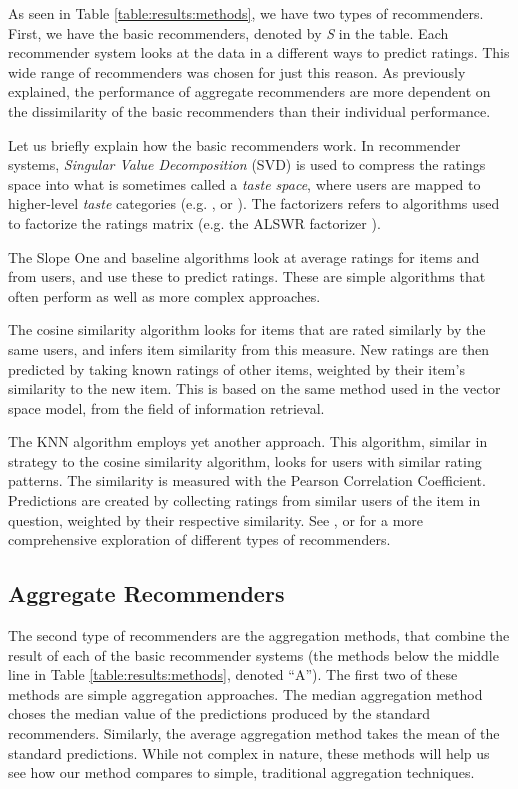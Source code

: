 As seen in Table \ref{table:results:methods}, we have two types of recommenders.
First, we have the basic recommenders, denoted by \emph{S} in the table.
Each recommender system looks at the data in a different ways to predict ratings.
This wide range of recommenders was chosen for just this reason.
As previously explained, the performance of aggregate recommenders
are more dependent on the dissimilarity of the basic recommenders
than their individual performance.

Let us briefly explain how the basic recommenders work.
In recommender systems, \emph{Singular Value Decomposition} (SVD) is used to compress 
the ratings space into what is sometimes called a \emph{taste space},
where users are mapped to higher-level \emph{taste} categories
(e.g. \cite[p.5]{Ahn2004}, \cite[p.4]{Brand2003} or \cite[p.2]{Liu2006}).
The factorizers refers to algorithms used to factorize the ratings matrix
(e.g. the ALSWR factorizer \cite{Zhou2008}).

The Slope One and baseline algorithms look at average
ratings for items and from users, and use these to predict ratings.
These are simple algorithms that often perform as well
as more complex approaches.

The cosine similarity algorithm looks for items that are rated
similarly by the same users, and infers item similarity from this measure.
New ratings are then predicted by taking known ratings of other items,
weighted by their item's similarity to the new item.
This is based on the same method used in the vector space model,
from the field of information retrieval.

The KNN algorithm employs yet another approach. This algorithm,
similar in strategy to the cosine similarity algorithm,
looks for users with similar rating patterns.
The similarity is measured with the Pearson Correlation Coefficient.
Predictions are created by collecting ratings from similar users
of the item in question, weighted by their respective similarity.
See \cite{Adomavicius2005}, \cite{Pazzani2007} or \cite{Schafer2007}
for a more comprehensive exploration of different types of recommenders.


\subsection{Aggregate Recommenders}

The second type of recommenders are the aggregation methods, 
that combine the result of each of the basic recommender systems
(the methods below the middle line in Table \ref{table:results:methods},
denoted ``A'').
The first two of these methods are simple aggregation approaches.
The median aggregation method choses the median value of the predictions
produced by the standard recommenders.
Similarly, the average aggregation method takes the mean of the
standard predictions.
While not complex in nature, these methods
will help us see how our method compares to simple, traditional
aggregation techniques.

